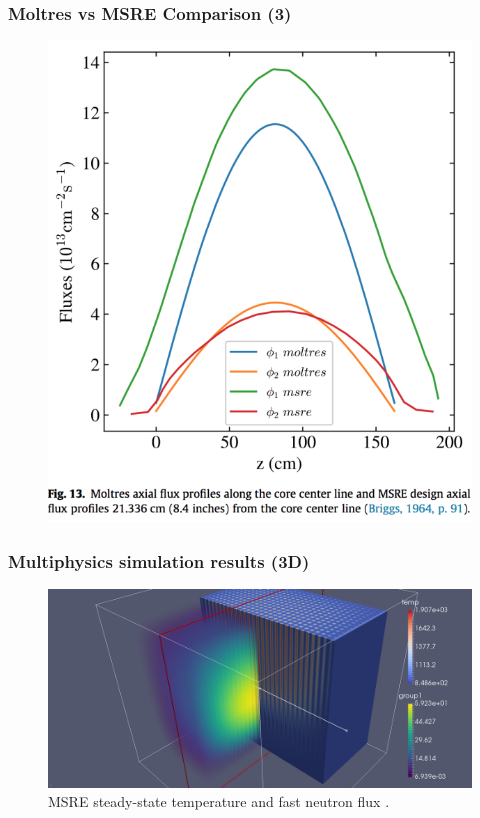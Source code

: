 \begin{frame}
  \frametitle{Moltres vs MSRE Comparison (3)}
  \begin{figure}[t]
   \includegraphics[height=0.85\textheight]{./images/msre_axial_flux.png}
    \end{figure}

\end{frame}

\begin{frame}
  \frametitle{Multiphysics simulation results (3D)}
  \begin{figure}[t]
   \vspace{-0.1in}
   \hspace*{-0.8in}
   \includegraphics[height=0.75\textheight]{./images/moltres_3D.png}
   \caption{\gls{MSRE} steady-state temperature and fast neutron flux \cite{ridley_introduction_2017}.}
    \end{figure}
\end{frame}

\begin{frame}
\end{frame}